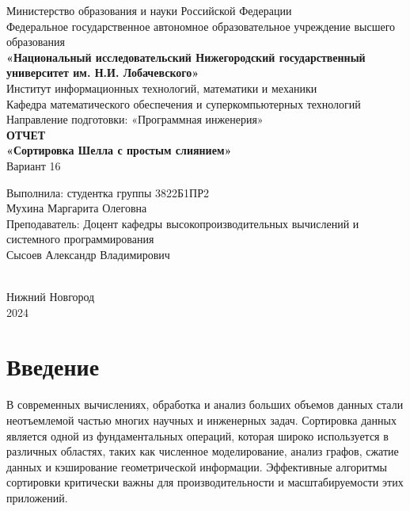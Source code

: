 \documentclass[12pt]{article}
\begin{document}
\begin{titlepage}
    \centering
    \large
    Министерство образования и науки Российской Федерации\\
    Федеральное государственное автономное образовательное учреждение высшего образования\\
    \textbf{«Национальный исследовательский Нижегородский государственный университет им. Н.И. Лобачевского»}\\[1cm]
    Институт информационных технологий, математики и механики\\
    Кафедра математического обеспечения и суперкомпьютерных технологий\\
    Направление подготовки: «Программная инженерия»\\[2cm]

    {\Large \textbf{ОТЧЕТ}}\\[0.5cm]
    {\Large \textbf{«Сортировка Шелла с простым слиянием»}}\\[0.5cm]
    {\Large Вариант 16}\\[4cm]

    \hfill\parbox{0.5\textwidth}{
        Выполнила: студентка группы 3822Б1ПР2\\
        Мухина Маргарита Олеговна\\
        Преподаватель: Доцент кафедры высокопроизводительных вычислений и системного программирования\\
        Сысоев Александр Владимирович
    }\\[4cm]

    Нижний Новгород\\
    2024
\end{titlepage}

\thispagestyle{empty}
\clearpage
{} 
\setcounter{page}{2} 
\tableofcontents
\clearpage
\setcounter{page}{3} 
\section{Введение}

\hspace*{1.25em}В современных вычислениях, обработка и анализ больших объемов данных стали неотъемлемой частью многих научных и инженерных задач. Сортировка данных является одной из фундаментальных операций, которая широко используется в различных областях, таких как численное моделирование, анализ графов, сжатие данных и кэширование геометрической информации. Эффективные алгоритмы сортировки критически важны для производительности и масштабируемости этих приложений.
\end{document}
